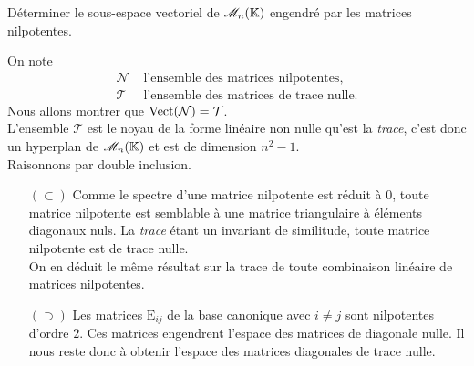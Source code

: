 \begin{exercice}
    Déterminer le sous-espace vectoriel de $\mathscr{M}_n(\mathbb{K})$ engendré par les matrices nilpotentes.
\end{exercice}

\begin{solution}
    On note 
    \begin{align*}
        \mathcal{N} & \text{ l'ensemble des matrices nilpotentes}, \\
        \mathcal{T} & \text{ l'ensemble des matrices de trace nulle.}
    \end{align*}
    Nous allons montrer que $\mathrm{Vect}(\mathcal{N}) = \mathcal{T}$. \\
    L'ensemble $\mathcal{T}$ est le noyau de la forme linéaire non nulle qu'est la \emph{trace}, c'est donc un hyperplan de $\mathscr{M}_n(\mathbb{K})$ et est de dimension $n^2-1$. \\
    Raisonnons par double inclusion.
    \begin{itemize}
        \item[$(\subset)$] Comme le spectre d'une matrice nilpotente est réduit à $0$, toute matrice nilpotente est semblable à une matrice triangulaire à éléments diagonaux nuls. La \emph{trace} étant un invariant de similitude, toute matrice nilpotente est de trace nulle. \\
        On en déduit le même résultat sur la trace de toute combinaison linéaire de matrices nilpotentes.
        \item[$(\supset)$] Les matrices $\mathrm{E}_{ij}$ de la base canonique avec $i \not= j$ sont nilpotentes d'ordre $2$. Ces matrices engendrent l'espace des matrices de diagonale nulle. Il nous reste donc à obtenir l'espace des matrices diagonales de trace nulle. \\
\end{itemize}
\end{solution}
